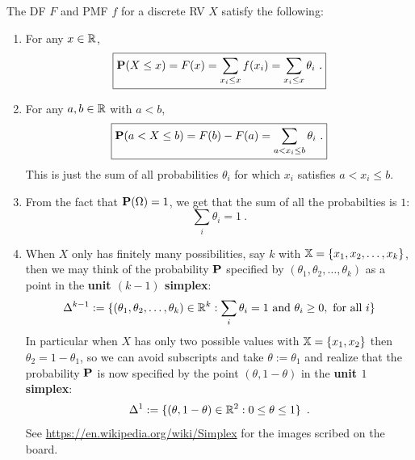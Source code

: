 The DF $F$ and PMF $f$ for a discrete RV $X$ satisfy the following:
\begin{enumerate}
\item  For any $x \in \mathbb{R}$, 
\begin{equation}\label{Eq:DiscreteDF}
\boxed{\mathbf{P}(X \leq x) = F(x)  = \sum_{x_i \leq x} f(x_i) = \sum_{x_i \leq x} \theta_i \ .}
\end{equation}
\item For any $a,b \in \mathbb{R}$ with $a<b$,
\begin{equation}\label{E:DRVFab}
\boxed{\mathbf{P}(a < X \leq b) = F(b) - F(a) = \sum_{a < x_i \leq b} \theta_i \ .}
\end{equation}
This is just the sum of all probabilities $\theta_i$ for which $x_i$ satisfies $a<x_i \leq b$. 
\item
From the fact that $\mathbf{P}(\Omega)=1$, we get that the sum of all the probabilties is $1$:
\begin{equation}\label{E:DRVsumofP}
\boxed{\sum_i \theta_i = 1 \ .}
\end{equation}
\item
When $X$ only has finitely many possibilities, say $k$ with $\mathbb{X} = \{x_1,x_2,\ldots,x_k\}$, then we may think of the probability $\mathbf{P}$ specified by $(\theta_1,\theta_2,\ldots,\theta_k)$ as a point in the \textbf{unit $(k-1)$ simplex}:
\begin{equation}\label{E:unitk-1simplex}
\Delta^{k-1} := \{ (\theta_1,\theta_2,\ldots,\theta_k) \in \mathbb{R}^{k} : \sum_i \theta_i = 1 \text{ and } \theta_i \geq 0, \text{ for all } i\}
\end{equation}
In particular when $X$ has only two possible values with $\mathbb{X} = \{x_1,x_2\}$ then $\theta_2=1-\theta_1$, so we can avoid subscripts and take $\theta := \theta_1$ and realize that the probability $\mathbf{P}$ is now specified by the point $(\theta,1-\theta)$ in the \textbf{unit $1$ simplex}:
\begin{equation}\label{E:unit1simplex}
\Delta^{1} := \{ (\theta,1-\theta) \in \mathbb{R}^2 : 0 \leq \theta \leq 1 \} \enspace .
\end{equation}
See \url{https://en.wikipedia.org/wiki/Simplex} for the images scribed on the board.
\end{enumerate}


